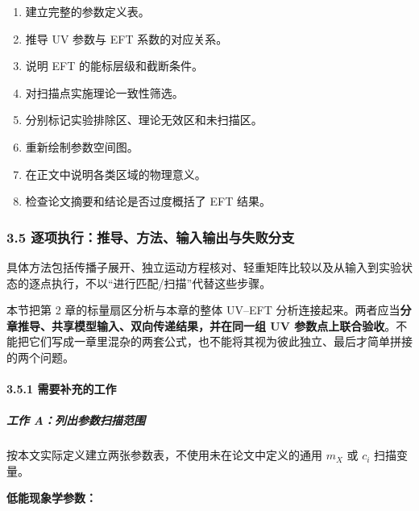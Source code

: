 \documentclass[
]{article}
\providecommand{\tightlist}{%
  \setlength{\itemsep}{0pt}\setlength{\parskip}{0pt}}
\begin{document}
\begin{enumerate}
\def\labelenumi{\arabic{enumi}.}
\tightlist
\item
  建立完整的参数定义表。
\item
  推导 UV 参数与 EFT 系数的对应关系。
\item
  说明 EFT 的能标层级和截断条件。
\item
  对扫描点实施理论一致性筛选。
\item
  分别标记实验排除区、理论无效区和未扫描区。
\item
  重新绘制参数空间图。
\item
  在正文中说明各类区域的物理意义。
\item
  检查论文摘要和结论是否过度概括了 EFT 结果。
\end{enumerate}

\subsubsection{3.5
逐项执行：推导、方法、输入输出与失败分支}\label{ux9010ux9879ux6267ux884cux63a8ux5bfcux65b9ux6cd5ux8f93ux5165ux8f93ux51faux4e0eux5931ux8d25ux5206ux652f-1}

具体方法包括传播子展开、独立运动方程核对、轻重矩阵比较以及从输入到实验状态的逐点执行，不以``进行匹配/扫描''代替这些步骤。

本节把第 2 章的标量扇区分析与本章的整体 UV--EFT
分析连接起来。两者应当\textbf{分章推导、共享模型输入、双向传递结果，并在同一组
UV
参数点上联合验收}。不能把它们写成一章里混杂的两套公式，也不能将其视为彼此独立、最后才简单拼接的两个问题。

\paragraph{3.5.1
需要补充的工作}\label{ux9700ux8981ux8865ux5145ux7684ux5de5ux4f5c}

\subparagraph{工作
A：列出参数扫描范围}\label{ux5de5ux4f5c-aux5217ux51faux53c2ux6570ux626bux63cfux8303ux56f4}

按本文实际定义建立两张参数表，不使用未在论文中定义的通用 \(m_X\) 或
\(c_i\) 扫描变量。

\textbf{低能现象学参数：}
\end{document}
